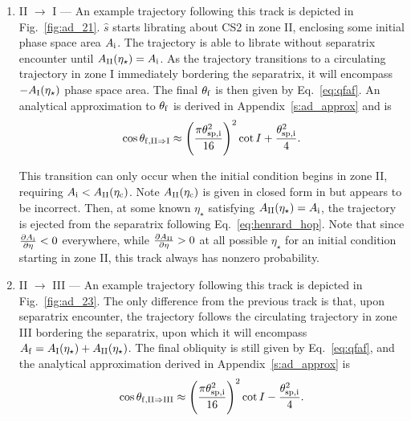 \documentclass[
        fleqn,
        usenatbib,
        referee,
    ]{mnras}
\newcommand*{\pd}[2]{\frac{\partial#1}{\partial#2}}
\newcommand*{\p}[1]{\left(#1\right)}
\begin{document}
\begin{enumerate}
    \item II $\to$ I --- An example trajectory following this track is depicted
        in Fig.~\ref{fig:ad_21}. $\hat{s}$ starts librating about CS2 in zone
        II, enclosing some initial phase space area $A_{\rm i}$. The trajectory is
        able to librate without separatrix encounter until $A_{\rm
        II}(\eta_\star) = A_{\rm i}$. As the trajectory transitions to a circulating
        trajectory in zone I immediately bordering the separatrix, it will
        encompass $-A_{\rm I}(\eta_\star)$ phase space area. The final
        $\theta_{\rm f}$ is then given by Eq.~\eqref{eq:qfaf}. An analytical
        approximation to $\theta_{\rm f}$ is derived in
        Appendix~\ref{s:ad_approx} and is
        \begin{equation}
            \cos \theta_{\rm f, II \Rightarrow I} \approx
                \p{\frac{\pi \theta_{\rm sp, i}^2}{16}}^2 \cot I
                    + \frac{\theta_{\rm sp, i}^2}{4}.\label{eq:qf_21_approx}
        \end{equation}

        This transition can only occur when the initial condition begins in zone
        II, requiring $A_{\rm i} < A_{\rm II}(\eta_{\rm c})$. Note $A_{\rm II}(\eta_{\rm c})$ is
        given in closed form in \citet{ward2004I} but appears to be incorrect.
        Then, at some known $\eta_\star$ satisfying $A_{\rm II}(\eta_\star) =
        A_{\rm i}$, the trajectory is ejected from the separatrix following
        Eq.~\eqref{eq:henrard_hop}. Note that since $\pd{A_{\rm i}}{\eta} < 0$
        everywhere, while $\pd{A_{\rm II}}{\eta} > 0$ at all possible
        $\eta_\star$ for an initial condition starting in zone II, this track
        always has nonzero probability.

    \item II $\to$ III --- An example trajectory following this track is
        depicted in Fig.~\ref{fig:ad_23}. The only difference from the previous
        track is that, upon separatrix encounter, the trajectory follows the
        circulating trajectory in zone III bordering the separatrix, upon
        which it will encompass $A_{\rm f} = A_{\rm I}(\eta_\star) + A_{\rm
        II}(\eta_\star)$. The final obliquity is still given by
        Eq.~\eqref{eq:qfaf}, and the analytical approximation derived in
        Appendix~\ref{s:ad_approx} is
        \begin{equation}
            \cos \theta_{\rm f, II \Rightarrow III} \approx
                \p{\frac{\pi \theta_{\rm sp, i}^2}{16}}^2 \cot I
                    - \frac{\theta_{\rm sp, i}^2}{4}.\label{eq:qf_23_approx}
        \end{equation}


\end{enumerate}
\end{document}
